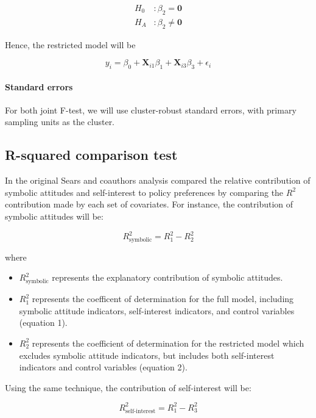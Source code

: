 \documentclass[]{article}
\let\oldparagraph\paragraph
\renewcommand{\paragraph}[1]{\oldparagraph{#1}\mbox{}}
\begin{document}
\[\begin{aligned}
H_0\ &: \beta_2 = \textbf{0}\\ H_A &: \beta_2 \neq \textbf{0}
\end{aligned}\]

Hence, the restricted model will be

\begin{equation}
y_i = \beta_0 + \textbf{X}_{i1}\beta_1 +  \textbf{X}_{i3}\beta_3 + \epsilon_i
\end{equation}

\paragraph{Standard errors}\label{standard-errors}

For both joint F-test, we will use cluster-robust standard errors, with
primary sampling units as the cluster.

\subsection{R-squared comparison test}\label{r-squared-comparison-test}

In the original Sears and coauthors analysis compared the relative
contribution of symbolic attitudes and self-interest to policy
preferences by comparing the \(R^2\) contribution made by each set of
covariates. For instance, the contribution of symbolic attitudes will
be:

\[R^2_{\text{symbolic}} = R^2_1 - R^2_2\]

where

\begin{itemize}
  \item $R^2_{\text{symbolic}}$ represents the explanatory contribution of symbolic attitudes.
  \item $R^2_1$ represents the coefficent of determination for the full model, including symbolic attitude indicators, self-interest indicators, and control variables (equation 1).
  \item $R^2_2$ represents the coefficient of determination for the restricted model which excludes symbolic attitude indicators, but includes both self-interest indicators and control variables (equation 2).
\end{itemize}

Using the same technique, the contribution of self-interest will be:

\[R^2_{\text{self-interest}} = R^2_1 - R^2_3\]
\end{document}

